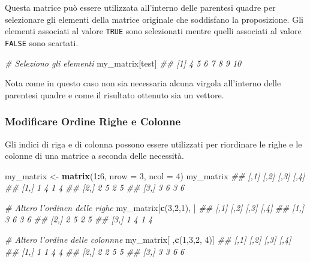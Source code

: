 \documentclass[
]{book}
\newenvironment{Shaded}{\begin{snugshade}}{\end{snugshade}}
\newcommand{\CommentTok}[1]{\textcolor[rgb]{0.56,0.35,0.01}{\textit{#1}}}
\newcommand{\DataTypeTok}[1]{\textcolor[rgb]{0.13,0.29,0.53}{#1}}
\newcommand{\DecValTok}[1]{\textcolor[rgb]{0.00,0.00,0.81}{#1}}
\newcommand{\KeywordTok}[1]{\textcolor[rgb]{0.13,0.29,0.53}{\textbf{#1}}}
\newcommand{\NormalTok}[1]{#1}
\newcommand{\OperatorTok}[1]{\textcolor[rgb]{0.81,0.36,0.00}{\textbf{#1}}}
\newcommand{\StringTok}[1]{\textcolor[rgb]{0.31,0.60,0.02}{#1}}
\begin{document}
Questa matrice può essere utilizzata all'interno delle parentesi quadre per selezionare gli elementi della matrice originale che soddisfano la proposizione. Gli elementi associati al valore \texttt{TRUE} sono selezionati mentre quelli associati al valore \texttt{FALSE} sono scartati.

\begin{Shaded}
\begin{Highlighting}[]
\CommentTok{# Seleziono gli elementi}
\NormalTok{my_matrix[test]}
\CommentTok{## [1]  4  5  6  7  8  9 10}
\end{Highlighting}
\end{Shaded}

Nota come in questo caso non sia necessaria alcuna virgola all'interno delle parentesi quadre e come il risultato ottenuto sia un vettore.

\hypertarget{modificare-ordine-righe-e-colonne}{%
\subsubsection*{Modificare Ordine Righe e Colonne}\label{modificare-ordine-righe-e-colonne}}

Gli indici di riga e di colonna possono essere utilizzati per riordinare le righe e le colonne di una matrice a seconda delle necessità.

\begin{Shaded}
\begin{Highlighting}[]
\NormalTok{my_matrix <-}\StringTok{ }\KeywordTok{matrix}\NormalTok{(}\DecValTok{1}\OperatorTok{:}\DecValTok{6}\NormalTok{, }\DataTypeTok{nrow =} \DecValTok{3}\NormalTok{, }\DataTypeTok{ncol =} \DecValTok{4}\NormalTok{)}
\NormalTok{my_matrix}
\CommentTok{##      [,1] [,2] [,3] [,4]}
\CommentTok{## [1,]    1    4    1    4}
\CommentTok{## [2,]    2    5    2    5}
\CommentTok{## [3,]    3    6    3    6}

\CommentTok{# Altero l'ordinen delle righe}
\NormalTok{my_matrix[}\KeywordTok{c}\NormalTok{(}\DecValTok{3}\NormalTok{,}\DecValTok{2}\NormalTok{,}\DecValTok{1}\NormalTok{), ]}
\CommentTok{##      [,1] [,2] [,3] [,4]}
\CommentTok{## [1,]    3    6    3    6}
\CommentTok{## [2,]    2    5    2    5}
\CommentTok{## [3,]    1    4    1    4}

\CommentTok{# Altero l'ordine delle colonnne}
\NormalTok{my_matrix[ ,}\KeywordTok{c}\NormalTok{(}\DecValTok{1}\NormalTok{,}\DecValTok{3}\NormalTok{,}\DecValTok{2}\NormalTok{, }\DecValTok{4}\NormalTok{)]}
\CommentTok{##      [,1] [,2] [,3] [,4]}
\CommentTok{## [1,]    1    1    4    4}
\CommentTok{## [2,]    2    2    5    5}
\CommentTok{## [3,]    3    3    6    6}
\end{Highlighting}
\end{Shaded}
\end{document}
